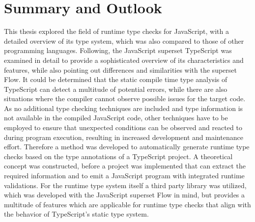 \chapter{Summary and Outlook}
\label{cha:summary_outlook}

This thesis explored the field of runtime type checks for JavaScript, with a detailed overview of its type system, which was also compared to those of other programming languages. Following, the JavaScript superset TypeScript was examined in detail to provide a sophisticated overview of its characteristics and features, while also pointing out differences and similarities with the superset Flow. It could be determined that the static compile time type analysis of TypeScript can detect a multitude of potential errors, while there are also situations where the compiler cannot observe possible issues for the target code. As no additional type checking techniques are included and type information is not available in the compiled JavaScript code, other techniques have to be employed to ensure that unexpected conditions can be observed and reacted to during program execution, resulting in increased development and maintenance effort. Therefore a method was developed to automatically generate runtime type checks based on the type annotations of a TypeScript project. A theoretical concept was constructed, before a project was implemented that can extract the required information and to emit a JavaScript program with integrated runtime validations. For the runtime type system itself a third party library was utilized, which was developed with the JavaScript superset Flow in mind, but provides a multitude of features which are applicable for runtime type checks that align with the behavior of TypeScript's static type system.

